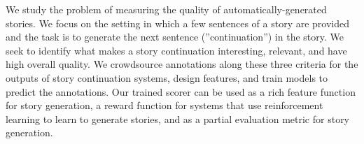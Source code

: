 We study the problem of measuring the quality of automatically-generated stories. We focus on the setting in which a few sentences of a story are provided and the task is to generate the next sentence (''continuation'') in the story. We seek to identify what makes a story continuation interesting, relevant, and have high overall quality. We crowdsource annotations along these three criteria for the outputs of story continuation systems, design features, and train models to predict the annotations. Our trained scorer can be used as a rich feature function for story generation, a reward function for systems that use reinforcement learning to learn to generate stories, and as a partial evaluation metric for story generation.
